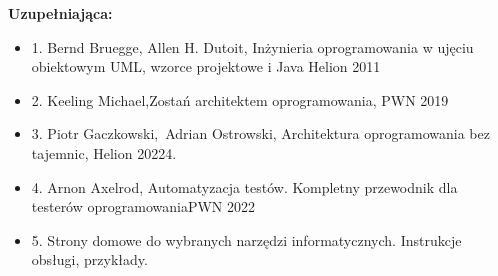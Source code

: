 \documentclass[12pt, a4paper]{article}
\begin{document}
\textbf{Uzupełniająca:}
\begin{itemize}
  \item 1. Bernd Bruegge,  Allen H. Dutoit, Inżynieria oprogramowania w ujęciu obiektowym UML, wzorce projektowe i Java Helion 2011
  \item 2. Keeling Michael,Zostań architektem oprogramowania, PWN 2019
  \item 3. Piotr Gaczkowski, Adrian Ostrowski, Architektura oprogramowania bez tajemnic, Helion 20224.
  \item 4. Arnon Axelrod, Automatyzacja testów. Kompletny przewodnik dla testerów oprogramowaniaPWN 2022
  \item 5. Strony domowe do wybranych narzędzi informatycznych. Instrukcje obsługi, przykłady.
\end{itemize}
\end{document}
